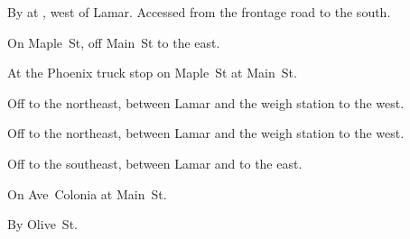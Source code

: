 
\begin{LocationList}

By  at , west of Lamar.
Accessed from the frontage road to the south.

On Maple~St, off   Main~St to the east.

At the Phoenix truck stop on Maple~St at   Main~St.

\Location{\GarageHQ \Garage}
Off   to the northeast, between Lamar and the weigh station to the west.

Off   to the northeast, between Lamar and the weigh station to the west.

Off   to the southeast, between Lamar and  to the east.

\Location{\TruckStop \Gas \Rest \Weigh}
On Ave~Colonia at   Main~St.

By   Olive~St.

\end{LocationList}

